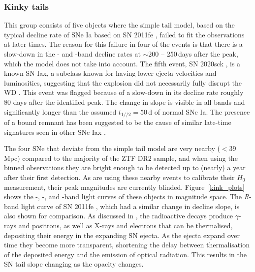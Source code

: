 \documentclass[a4paper,oneside,12pt, class=Latex/Classes/PhDthesisPSnPDF, crop=false]{standalone}
\begin{document}
\subsubsection{Kinky tails}
\label{kink_tails}
This group consists of five objects where the simple tail model, based on the typical decline rate of SNe Ia based on SN 2011fe \citep{Georgios_11fe}, failed to fit the observations at later times. The reason for this failure in four of the events is that there is a slow-down in the \ztfr- and \ztfi-band decline rates at $\sim200$ -- 250\,days after the peak, which the model does not take into account. The fifth event, SN 2020sck \citep{2020sck_Iax}, is a known SN Iax, a subclass known for having lower ejecta velocities and luminosities, suggesting that the explosion did not necessarily fully disrupt the WD \citep{Iax_model_1, Iax_model_2}. This event was flagged because of a slow-down in its decline rate roughly 80 days after the identified peak. The change in slope is visible in all bands and significantly longer than the assumed $t_{1//2} = 50$\,d of normal SNe Ia. The presence of a bound remnant has been suggested to be the cause of similar late-time signatures seen in other SNe Iax \citep{Kawabata_iax14dt, close_Iax, Camacho-Neves_iax14dt}.

The four SNe that deviate from the simple tail model are very nearby ($< 39$ Mpc) compared to the majority of the ZTF DR2 sample, and when using the binned observations they are bright enough to be detected up to (nearly) a year after their first detection. As \citet{DR2_Overview} are using these nearby events to calibrate their $H_0$ measurement, their peak magnitudes are currently blinded. Figure~\ref{kink_plots} shows the \ztfg-, \ztfr-, and \ztfi-band light curves of these objects in magnitude space. The \textit{R}-band light curve of SN 2011fe \citep{spec_Lijiang-2.4m}, which had a similar change in decline slope, is also shown for comparison. As discussed in \citet{Georgios_11fe}, the radioactive decays produce $\gamma$-rays and positrons, as well as X-rays and electrons that can be thermalised, depositing their energy in the expanding SN ejecta. As the ejecta expand over time they become more transparent, shortening the delay between thermalisation of the deposited energy and the emission of optical radiation. This results in the SN tail slope changing as the opacity changes.
\end{document}
